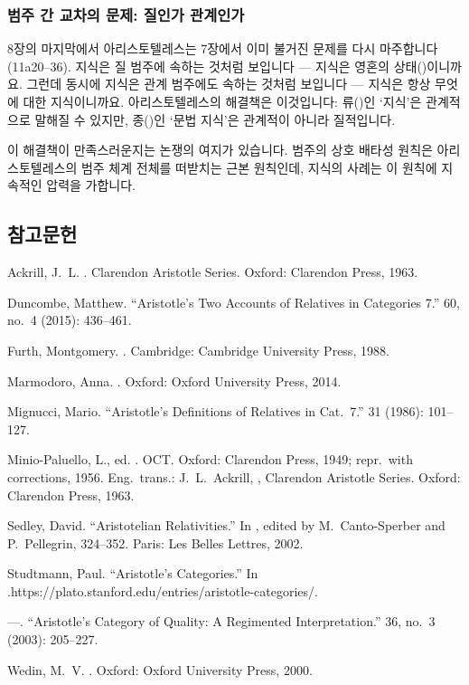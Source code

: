 \documentclass[12pt, a4paper]{article}
\begin{document}
\subsubsection{범주 간 교차의 문제: 질인가 관계인가}

8장의 마지막에서 아리스토텔레스는 7장에서 이미 불거진 문제를 다시 마주합니다(11a20--36). 지식은 질 범주에 속하는 것처럼 보입니다 --- 지식은 영혼의 상태()이니까요. 그런데 동시에 지식은 관계 범주에도 속하는 것처럼 보입니다 --- 지식은 항상 무엇에 대한 지식이니까요. 아리스토텔레스의 해결책은 이것입니다: 류()인 `지식'은 관계적으로 말해질 수 있지만, 종()인 `문법 지식'은 관계적이 아니라 질적입니다.

이 해결책이 만족스러운지는 논쟁의 여지가 있습니다. 범주의 상호 배타성 원칙은 아리스토텔레스의 범주 체계 전체를 떠받치는 근본 원칙인데, 지식의 사례는 이 원칙에 지속적인 압력을 가합니다.

\subsection*{참고문헌}
\begin{references}

 Ackrill, J.\ L. . Clarendon Aristotle Series. Oxford: Clarendon Press, 1963.

 Duncombe, Matthew. ``Aristotle's Two Accounts of Relatives in Categories 7.''  60, no.\ 4 (2015): 436--461.

 Furth, Montgomery. . Cambridge: Cambridge University Press, 1988.

 Marmodoro, Anna. . Oxford: Oxford University Press, 2014.

 Mignucci, Mario. ``Aristotle's Definitions of Relatives in Cat.\ 7.''  31 (1986): 101--127.

 Minio-Paluello, L., ed. . OCT. Oxford: Clarendon Press, 1949; repr.\ with corrections, 1956. Eng.\ trans.: J.\ L.\ Ackrill, , Clarendon Aristotle Series. Oxford: Clarendon Press, 1963.

 Sedley, David. ``Aristotelian Relativities.'' In , edited by M.\ Canto-Sperber and P.\ Pellegrin, 324--352. Paris: Les Belles Lettres, 2002.

 Studtmann, Paul. ``Aristotle's Categories.'' In .\newline https://plato.stanford.edu/entries/aristotle-categories/.

 ---. ``Aristotle's Category of Quality: A Regimented Interpretation.''  36, no.\ 3 (2003): 205--227.

 Wedin, M.\ V. . Oxford: Oxford University Press, 2000.

\end{references}
\end{document}
